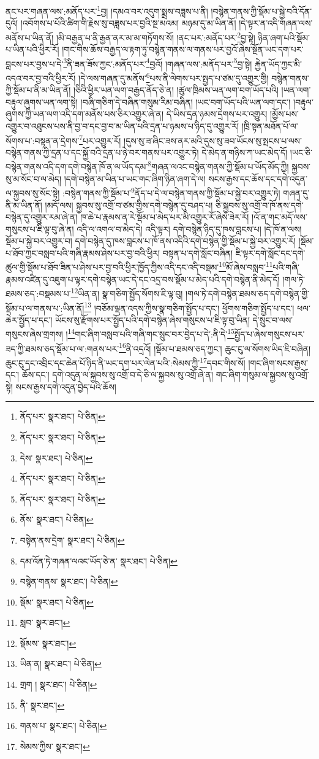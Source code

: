 ནང་པར་གཞན་ལས་:མནོད་པར་\footnote{ནོད་པར་  སྣར་ཐང་།  པེ་ཅིན། }བྱ། །དམའ་བར་འདུག་སྨྲས་བཟླས་པ་ནི། །བསྙེན་གནས་ཀྱི་སྡོམ་པ་སྐྱེ་བའི་དོན་དུའོ། །འབོགས་པ་པོའི་ཚིག་གི་རྗེས་སུ་བཟླས་པར་བྱའི་སྔ་མའམ། མཉམ་དུ་མ་ཡིན་ནོ། །དེ་ལྟར་ན་འདི་གཞན་ལས་མནོས་པ་ཡིན་ནོ། །མི་བརྒྱན་པ་ནི་རྒྱན་ནར་མ་མ་གཏོགས་སོ། །ནང་པར་:མནོད་པར་\footnote{ནོད་པར་  སྣར་ཐང་།  པེ་ཅིན། }བྱ་སྟེ། ཉིན་ཞག་པའི་སྡོམ་པ་ཡིན་པའི་ཕྱིར་རོ། །གང་གིས་ཆོས་བརྒྱད་ལ་རྟག་ཏུ་བསྙེན་གནས་ལ་གནས་པར་བྱའོ་ཞེས་སྔོན་ཡང་དག་པར་བླངས་པར་བྱས་པ་དེ་\footnote{དེས་  སྣར་ཐང་།  པེ་ཅིན། }ནི་ཟན་ཟོས་ཀྱང་:མནོད་པར་\footnote{ནོད་པར་  སྣར་ཐང་།  པེ་ཅིན། }བྱའོ། །གཞན་ལས་:མནོད་པར་\footnote{ནོད་པར་  སྣར་ཐང་།  པེ་ཅིན། }བྱ་སྟེ། རྐྱེན་ཡོད་ཀྱང་མི་འདའ་བར་བྱ་བའི་ཕྱིར་རོ། །དེ་ལས་གཞན་དུ་མནོས་\footnote{ནོས་  སྣར་ཐང་།  པེ་ཅིན། }པས་ནི་ལེགས་པར་སྤྱད་པ་ཙམ་དུ་འགྱུར་གྱི། བསྙེན་གནས་ཀྱི་སྡོམ་པ་ནི་མ་ཡིན་ནོ། །ཅིའི་ཕྱིར་ཡན་ལག་བརྒྱད་ནོད་ཅེ་ན། །ཚུལ་ཁྲིམས་ཡན་ལག་བག་ཡོད་པའི། །ཡན་ལག་བརྟུལ་ཞུགས་ཡན་ལག་སྟེ། །བཞི་གཅིག་དེ་བཞིན་གསུམ་རིམ་བཞིན། །ཡང་བག་ཡོད་པའི་ཡན་ལག་དང་། །བརྟུལ་ཞུགས་ཀྱི་ཡན་ལག་འདི་དག་མནོས་པས་ཅིར་འགྱུར་ཞེ་ན། དེ་ཡིས་དྲན་ཉམས་དྲེགས་པར་འགྱུར། །མྱོས་པས་འགྱུར་བ་འཐུངས་པས་ནི་བྱ་བ་དང་བྱ་བ་མ་ཡིན་པའི་དྲན་པ་ཉམས་པ་ཉིད་དུ་འགྱུར་རོ། །ཁྲི་སྟན་མཐོན་པོ་ལ་སོགས་པ་:བསྟན་ན་དྲེགས་\footnote{བསྟེན་ནས་དྲེག་  སྣར་ཐང་།  པེ་ཅིན། }པར་འགྱུར་རོ། །དུས་སུ་ཟ་ཞིང་ཟས་ནར་མའི་དུས་སུ་ཟབ་ཡོངས་སུ་སྤངས་པ་ལས་བསྙེན་གནས་ཀྱི་དྲན་པ་དང་སྐྱོ་བའི་དྲན་པ་ཉེ་བར་གནས་པར་འགྱུར་ཏེ། དེ་མེད་ན་གཉིས་ཀ་ཡང་མེད་དོ། །ཡང་ཅི་བསྙེན་གནས་འདི་དག་དགེ་བསྙེན་ཁོ་ན་ལ་ཡོད་དམ་\footnote{དམ་འོན་ཏེ་གཞན་ལའང་ཡོད་ཅེ་ན་  སྣར་ཐང་།  པེ་ཅིན། }གཞན་ལའང་བསྙེན་གནས་ཀྱི་སྡོམ་པ་ཡོད་མོད་ཀྱི། སྐྱབས་སུ་མ་སོང་བ་ལ་མེད། །དགེ་བསྙེན་མ་ཡིན་པ་ཡང་གང་ཞིག་ཉིན་ཞག་དེ་ལ། སངས་རྒྱས་དང་ཆོས་དང་དགེ་འདུན་ལ་སྐྱབས་སུ་སོང་སྟེ། :བསྙེན་གནས་ཀྱི་སྡོམ་པ་\footnote{བསྙེན་གནས་  སྣར་ཐང་།  པེ་ཅིན། }ནོད་པ་དེ་ལ་བསྙེན་གནས་ཀྱི་སྡོམ་པ་སྐྱེ་བར་འགྱུར་ཏེ། གཞན་དུ་ནི་མ་ཡིན་ནོ། །མདོ་ལས། སྐྱབས་སུ་འགྲོ་བ་ཙམ་གྱིས་དགེ་བསྙེན་དུ་བཤད་པ། ཅི་སྐྱབས་སུ་འགྲོ་བ་ཁོ་ནས་དགེ་བསྙེན་དུ་འགྱུར་རམ་ཞེ་ན། ཁ་ཆེ་པ་རྣམས་ན་རེ་སྡོམ་པ་མེད་པར་མི་འགྱུར་རོ་ཞེས་ཟེར་རོ། །འོ་ན་གང་མདོ་ལས་གསུངས་པ་ཇི་ལྟ་བུ་ཞེ་ན། འདི་ལ་འགལ་བ་མེད་དེ། འདི་ལྟར། དགེ་བསྙེན་ཉིད་དུ་ཁས་བླངས་པ། །དེ་ཁོ་ན་ལས། སྡོམ་པ་སྐྱེ་བར་འགྱུར་བ། དགེ་བསྙེན་དུ་ཁས་བླངས་པ་ཁོ་ནས་འདིའི་དགེ་བསྙེན་གྱི་སྡོམ་པ་སྐྱེ་བར་འགྱུར་རོ། །སྡོམ་པ་ཐོབ་ཀྱང་བསླབ་པའི་གཞི་རྣམས་ཤེས་པར་བྱ་བའི་ཕྱིར། བསྟན་པ་དགེ་སློང་བཞིན། ཇི་ལྟར་དགེ་སློང་དང་དགེ་ཚུལ་གྱི་སྡོམ་པ་ཐོབ་ཟིན་པ་ཤེས་པར་བྱ་བའི་ཕྱིར་ཁྱོད་ཀྱིས་འདི་དང་འདི་བསྡམ་\footnote{སྡོམ་  སྣར་ཐང་།  པེ་ཅིན། }མོ་ཞེས་བསླབ་\footnote{སླབ་  སྣར་ཐང་། }པའི་གཞི་རྣམས་འཛིན་དུ་འཇུག་པ་ལྟར་དགེ་བསྙེན་ཡང་དེ་དང་འདྲ་བས་སྡོམ་པ་མེད་པའི་དགེ་བསྙེན་ནི་མེད་དོ། །གལ་ཏེ་ཐམས་ཅད་:བསྡམས་པ་\footnote{སྡོམས་  སྣར་ཐང་། }ཡིན་ན། སྣ་གཅིག་སྤྱོད་སོགས་ཇི་ལྟ་བུ། །གལ་ཏེ་དགེ་བསྙེན་ཐམས་ཅད་དགེ་བསྙེན་གྱི་སྡོམ་པ་ལ་གནས་པ་:ཡིན་ནོ།\footnote{ཡིན་ན།  སྣར་ཐང་།  པེ་ཅིན། } །བཅོམ་ལྡན་འདས་ཀྱིས་སྣ་གཅིག་སྤྱོད་པ་དང་། ཕྱོགས་གཅིག་སྤྱོད་པ་དང་། ཕལ་ཆེར་སྤྱོད་པ་དང་། ཡོངས་སུ་རྫོགས་པར་སྤྱོད་པའི་དགེ་བསྙེན་ཞེས་གསུངས་པ་ཇི་ལྟ་བུ་ཡིན། དེ་སྲུང་བ་ལས་གསུངས་ཞེས་གྲགས། །\footnote{གྲག །  སྣར་ཐང་།  པེ་ཅིན། }གང་ཞིག་བསླབ་པའི་གཞི་གང་སྲུང་བར་བྱེད་པ་དེ་:ནི་དེ་\footnote{ནི་  སྣར་ཐང་། }སྤྱོད་པ་ཞེས་གསུངས་པར་ཟད་ཀྱི་ཐམས་ཅད་སྡོམ་པ་ལ་:གནས་པར་\footnote{གནས་པ་  སྣར་ཐང་།  པེ་ཅིན། }ནི་འདྲའོ། །སྡོམ་པ་ཐམས་ཅད་ཀྱང་། ཆུང་ངུ་ལ་སོགས་ཡིད་ཇི་བཞིན། ཆུང་ངུ་དང་འབྲིང་དང་ཆེན་པོ་ཉིད་ནི་ཡང་དག་པར་ལེན་པའི་:སེམས་ཀྱི་\footnote{སེམས་ཀྱིས་  སྣར་ཐང་། }དབང་གིས་སོ། །གང་ཞིག་སངས་རྒྱས་དང་། ཆོས་དང་། དགེ་འདུན་ལ་སྐྱབས་སུ་འགྲོ་བ་དེ་ཅི་ལ་སྐྱབས་སུ་འགྲོ་ཞེ་ན། གང་ཞིག་གསུམ་ལ་སྐྱབས་སུ་འགྲོ་སྟེ། སངས་རྒྱས་དགེ་འདུན་བྱེད་པའི་ཆོས། 